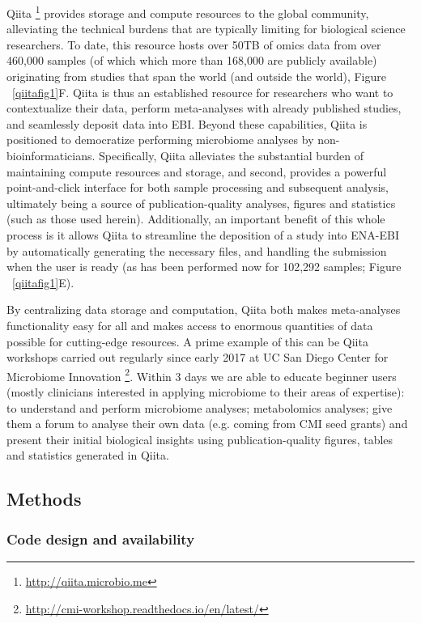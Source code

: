 Qiita \footnote{\url{http://qiita.microbio.me}} provides storage and compute resources to
the global community, alleviating the technical burdens that are typically limiting for
biological science researchers. To date, this resource hosts over 50TB of omics data from
over 460,000 samples (of which which more than 168,000 are publicly available) originating
from studies that span the world (and outside the world), Figure  ~\ref{qiitafig1}F. Qiita
is thus an established resource for researchers who want to contextualize their data, perform
meta-analyses with already published studies, and seamlessly deposit data into EBI. Beyond these
capabilities, Qiita is positioned to democratize performing microbiome analyses by
non-bioinformaticians. Specifically, Qiita alleviates the substantial burden of maintaining
compute resources and storage, and second, provides a powerful point-and-click interface for
both sample processing and subsequent analysis, ultimately being a source of publication-quality
analyses, figures and statistics (such as those used herein). Additionally, an important
benefit of this whole process is it allows Qiita to streamline the deposition of a study
into ENA-EBI by automatically generating the necessary files, and handling the submission
when the user is ready (as has been performed now for 102,292 samples; Figure ~\ref{qiitafig1}E).

By centralizing data storage and computation, Qiita both makes meta-analyses functionality
easy for all and makes access to enormous quantities of data possible for cutting-edge resources.
A prime example of this can be Qiita workshops carried out regularly since early 2017 at UC
San Diego Center for Microbiome Innovation \footnote{\url{http://cmi-workshop.readthedocs.io/en/latest/}}.
Within 3 days we are able to educate beginner users (mostly clinicians interested in
applying microbiome to their areas of expertise): to understand and perform microbiome
analyses; metabolomics analyses; give them a forum to analyse their own data (e.g. coming
from CMI seed grants) and present their initial biological insights using publication-quality
figures, tables and statistics generated in Qiita.

\subsection{Methods}

\subsubsection{Code design and availability}


